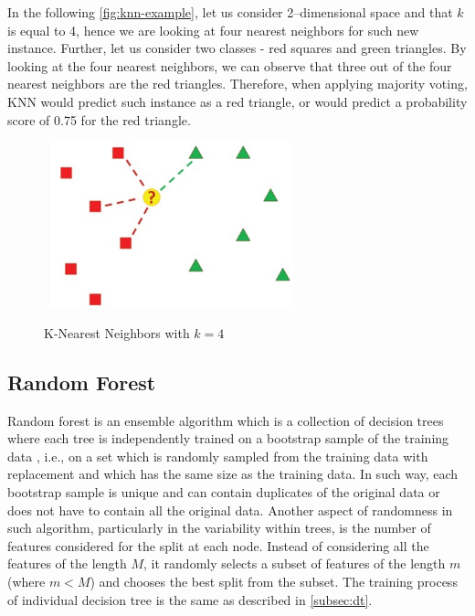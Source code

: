 In the following \autoref{fig:knn-example}, let us consider 2--dimensional space and that $k$ is equal to 4, hence we are looking at four nearest neighbors for such new instance. Further, let us consider two classes - red squares and green triangles.
By looking at the four nearest neighbors, we can observe that three out of the four nearest neighbors are the red triangles.
Therefore, when applying majority voting, KNN would predict such instance as a red triangle, or would predict a probability score of 0.75 for the red triangle.

\begin{figure}[H]
    \centering
    \caption{K-Nearest Neighbors with $k=4$}\vspace{0.5em}
    \label{fig:knn-example}\
    \includegraphics[width=70mm]{Figures/KNN_example.jpg}

    \vspace{-1em}
\end{figure}
\newpage
\subsection{Random Forest}

Random forest is an ensemble algorithm which is a collection of decision trees where each tree is independently trained on a bootstrap sample of the training data \citep{han2011data}, i.e., on a set which is randomly sampled from the training data with replacement and which has the same size as the training data. In such way, each bootstrap sample is unique and can contain duplicates of the original data or does not have to contain all the original data.
Another aspect of randomness in such algorithm, particularly in the variability within trees, is the number of features considered for the split at each node.
Instead of considering all the features of the length $M$, it randomly selects a subset of features of the length $m$ (where $m<M$) and chooses the best split from the subset.
The training process of individual decision tree is the same as described in \autoref{subsec:dt}.

